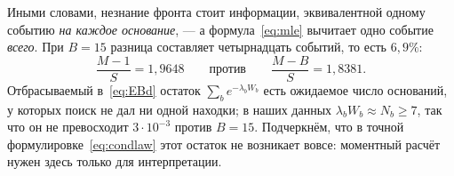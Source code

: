 \documentclass[11pt,a4paper]{article}
\theoremstyle{plain}
\theoremstyle{remark}
\begin{document}
Иными словами, незнание фронта стоит информации, эквивалентной одному событию
\emph{на каждое основание}, --- а формула~\eqref{eq:mle} вычитает одно событие
\emph{всего}. При $B=15$ разница составляет четырнадцать событий, то есть $6{,}9\%$:
\begin{equation}\label{eq:cost}
\frac{M-1}{S}=1{,}9648\qquad\text{против}\qquad\frac{M-B}{S}=1{,}8381 .
\end{equation}
Отбрасываемый в~\eqref{eq:EBd} остаток $\sum_b e^{-\lambda_b W_b}$ есть ожидаемое
число оснований, у которых поиск не дал ни одной находки; в наших данных
$\lambda_bW_b\approx N_b\ge7$, так что он не превосходит $3\cdot10^{-3}$ против
$B=15$. Подчеркнём, что в точной формулировке~\eqref{eq:condlaw} этот остаток не
возникает вовсе: моментный расчёт нужен здесь только для интерпретации.
\end{document}
